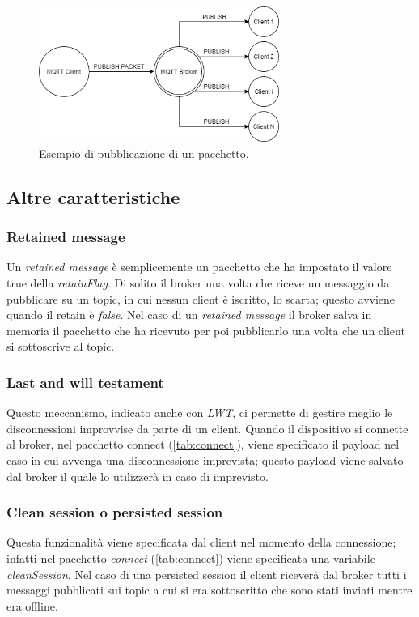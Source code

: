 \documentclass[binding=0.6cm,TFA]{sapthesis}
\begin{document}
\begin{large}
\begin{figure}[h]
\centering
\includegraphics[width=0.7\textwidth]{images/publish-flow-example.png}
\caption{Esempio di pubblicazione di un pacchetto.}
\label{fig:publish-flow-example}
\end{figure}

\subsection{Altre caratteristiche}
\subsubsection{Retained message}
Un \textit{retained message} è semplicemente un pacchetto che ha impostato il valore true della \textit{retainFlag}. Di solito il broker una volta che riceve un messaggio da pubblicare su un topic, in cui nessun client è iscritto, lo scarta; questo avviene quando il retain è \textit{false}. Nel caso di un \textit{retained message} il broker salva in memoria il pacchetto che ha ricevuto per poi pubblicarlo una volta che un client si sottoscrive al topic.

\subsubsection{Last and will testament}
Questo meccanismo, indicato anche con \textit{LWT}, ci permette di gestire meglio le disconnessioni improvvise da parte di un client. Quando il dispositivo si connette al broker, nel pacchetto connect (\autoref{tab:connect}), viene specificato il payload nel caso in cui avvenga una disconnessione imprevista; questo payload viene salvato dal broker il quale lo utilizzerà in caso di imprevisto.

\subsubsection{Clean session o persisted session}
Questa funzionalità viene specificata dal client nel momento della connessione; infatti nel pacchetto \textit{connect} (\autoref{tab:connect}) viene specificata una variabile \textit{cleanSession}. Nel caso di una persisted session il client riceverà dal broker tutti i messaggi pubblicati sui topic a cui si era sottoscritto che sono stati inviati mentre era offline.



\end{large}
\end{document}
